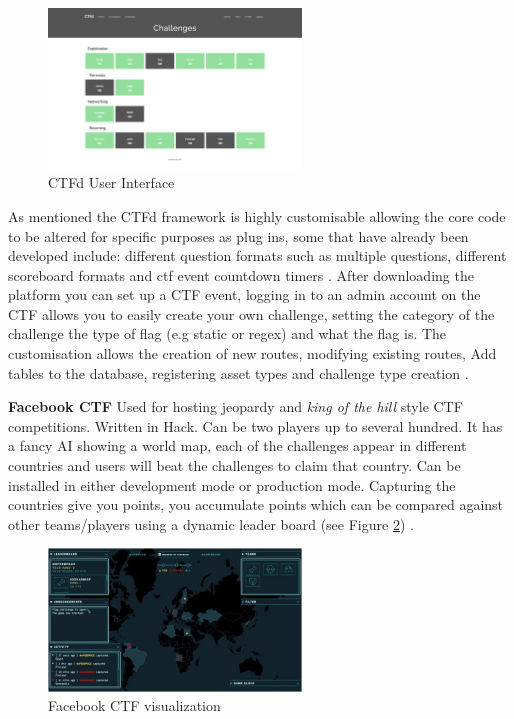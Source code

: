 \documentclass[12pt,a4paper]{article}
\begin{document}
\begin{figure}[h]
    \centering
    \includegraphics[width=0.6\textwidth]{Figs/ctfd.png} 
    \caption{CTFd User Interface}
    \label{fig:fig4}
\end{figure} 

As mentioned the CTFd framework is highly customisable allowing the core code to be altered for specific purposes as plug ins, some that have already been developed include: different question formats such as multiple questions, different scoreboard formats and ctf event countdown timers \cite{ctfdplugin}. After downloading the platform you can set up a CTF event, logging in to an admin account on the CTF allows you to easily create your own challenge, setting the category of the challenge the type of flag (e.g static or regex) and what the flag is. The customisation allows the creation of new routes, modifying existing routes, Add tables to the database, registering asset types and challenge type creation \cite{ctfdplugin2}.     


\textbf{Facebook CTF} 
Used for hosting jeopardy and \emph{king of the hill} style CTF competitions. Written in Hack. Can be two players up to several hundred. It has a fancy AI showing a world map, each of the challenges appear in different countries and users will beat the challenges to claim that country. Can be installed in either development mode or production mode. Capturing the countries give you points, you accumulate points which can be compared against other teams/players using a dynamic leader board (see Figure \ref{fig:fig5}) \cite{fbctf}.  

\begin{figure}[h]
    \centering
    \includegraphics[width=0.6\textwidth]{Figs/fbctf.jpg} 
    \caption{Facebook CTF visualization}
    \label{fig:fig5}
\end{figure}   
\end{document}
